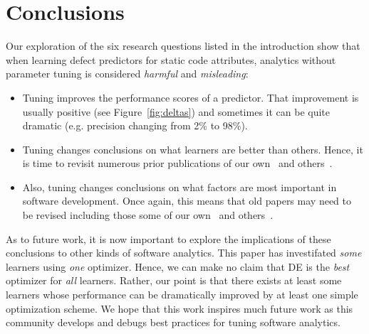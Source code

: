 \documentclass{sig-alternative}
\newcommand{\bi}{\begin{itemize}[leftmargin=0.4cm]}
\newcommand{\ei}{\end{itemize}}
\newcommand{\fig}[1]{Figure~\ref{fig:#1}}
\begin{document}







\section{Conclusions}


Our exploration of the six research
questions listed in the introduction
show that when learning defect predictors for static code
attributes,   analytics without parameter tuning is considered {\em harmful} and {\em misleading}:
\bi
\item Tuning improves the performance scores of a predictor.
That improvement is usually positive (see \fig{deltas}) and sometimes
it can be quite   dramatic (e.g. precision changing from 2\% to 98\%). \item 
Tuning changes conclusions on what learners are better than others.
Hence, it is time to revisit numerous prior publications of our own~\cite{me07b}
and others~\cite{lessmann2008benchmarking,hall11}.
\item
Also,
tuning changes conclusions on what factors are most important in software development.
Once again, this means that old papers may need to be revised including those
some of our own~\cite{me02k} and others~\cite{bell2013limited,rahman2013how,Moser:2008,zimmermann2007predicting,herzig2013predicting}. 
\ei
As to future work, it is now important
to explore the implications of these
conclusions to other kinds of software analytics.
 This paper has investifated  {\em some} learners using {\em one}  optimizer. Hence, we can make
no claim that DE is the {\em best} optimizer for {\em all} learners.
Rather, our point is that there exists at least some learners
whose performance can be dramatically improved by 
at least one simple optimization scheme.  We hope that this work inspires
much future work as this community develops and debugs best practices for tuning
software analytics.
\end{document}
